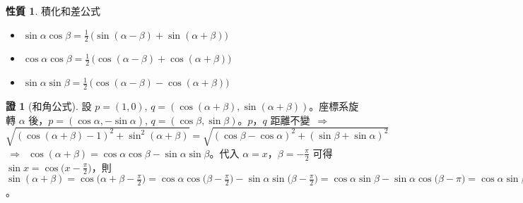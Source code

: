 \documentclass[12pt]{extarticle}
\newcommand{\ds}{\displaystyle}
\newcommand{\ie}{\,\Longrightarrow\,}
\theoremstyle{definition}
\newtheorem*{prp}{性質}
\newtheorem*{prf}{證}
\begin{document}
\begin{prp} 積化和差公式 
  \begin{itemize}\setlength\itemsep{0em}
    \item $\ds\sin\alpha\cos\beta = \frac{1}{2}\,\big(\sin(\alpha - \beta) + \sin(\alpha + \beta)\big)$
    \item $\ds\cos\alpha\cos\beta = \frac{1}{2}\,\big(\cos(\alpha - \beta) + \cos(\alpha + \beta)\big)$
    \item $\ds\sin\alpha\sin\beta = \frac{1}{2}\,\big(\cos(\alpha - \beta) - \cos(\alpha + \beta)\big)$
  \end{itemize}
\end{prp}

\begin{prf}[和角公式]
  設 $p = (1, 0)$, $q = (\cos(\alpha+\beta), \sin(\alpha+\beta))$。座標系旋轉 $\alpha$ 後，$p = (\cos\alpha, -\sin\alpha)$, $q = (\cos\beta, \sin\beta)$。$p$，$q$ 距離不變 $\ie$ $\ds\sqrt{(\cos(\alpha+\beta) - 1)^2 + \sin^2(\alpha + \beta)} = \sqrt{(\cos\beta - \cos\alpha)^2 + (\sin\beta + \sin\alpha)^2}$ $\ie$ $\cos(\alpha + \beta) = \cos\alpha\cos\beta-\sin\alpha\sin\beta$。代入 $\ds\alpha = x$，$\ds\beta = -\frac{\pi}{2}$ 可得 $\ds\sin x = \cos\big(x - \frac{\pi}{2}\big)$，則 $\ds\sin(\alpha + \beta) = \cos\big(\alpha + \beta - \frac{\pi}{2}\big) = \cos\alpha \cos\big(\beta - \frac{\pi}{2}\big) - \sin\alpha\sin\big(\beta - \frac{\pi}{2}\big) = \cos\alpha\sin\beta - \sin\alpha\cos\big(\beta - \pi\big) = \cos\alpha\sin\beta - \sin\alpha(\cos\beta\cos\pi + \sin\beta\sin\pi) = \cos\alpha\sin\beta + \sin\alpha\cos\beta$。 
\end{prf}
\end{document}
